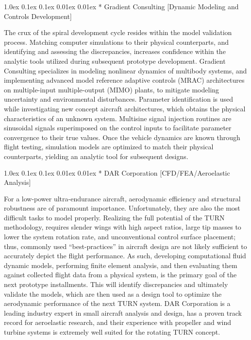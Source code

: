 \documentclass[11pt]{article}
\makeatletter
\renewcommand\subsection{
\@startsection{subsection}{2}{\z@}%
{1.0ex \@plus 0.1ex \@minus 0.1ex}%
{0.01ex \@plus 0.01ex}%
{\normalfont\Large\bfseries}}
\makeatother
\begin{document}
\subsection*{\color{green} Gradient Consulting [Dynamic Modeling and Controls Development]}

The crux of the spiral development cycle resides within the model validation process.  Matching computer simulations to their physical counterparts, and identifying and assessing the discrepancies, increases confidence within the analytic tools utilized during subsequent prototype development.  Gradient Consulting specializes in modeling nonlinear dynamics of multibody systems, and implementing advanced model reference adaptive controls (MRAC) architectures on multiple-input multiple-output (MIMO) plants, to mitigate modeling uncertainty and environmental disturbances.  Parameter identification is used while investigating new concept aircraft architectures, which obtains the physical characteristics of an unknown system.  Multisine signal injection routines are sinusoidal signals superimposed on the control inputs to facilitate parameter convergence to their true values.  Once the vehicle dynamics are known through flight testing, simulation models are optimized to match their physical counterparts, yielding an analytic tool for subsequent designs.




\subsection*{\color{green} DAR Corporation [CFD/FEA/Aeroelastic Analysis]}

For a low-power ultra-endurance aircraft, aerodynamic efficiency and structural robustness are of paramount importance.  Unfortunately, they are also the most difficult tasks to model properly.  Realizing the full potential of the TURN methodology, requires slender wings with high aspect ratios, large tip masses to lower the system rotation rate, and unconventional control surface placement; thus, commonly used ``best-practices'' in aircraft design are not likely sufficient to accurately depict the flight performance.  As such, developing computational fluid dynamic models, performing finite element analysis, and then evaluating them against collected flight data from a physical system, is the primary goal of the next prototype installments.  This will identify discrepancies and ultimately validate the models, which are then used as a design tool to optimize the aerodynamic performance of the next TURN system.  DAR Corporation is a leading industry expert in small aircraft analysis and design, has a proven track record for aeroelastic research, and their experience with propeller and wind turbine systems is extremely well suited for the rotating TURN concept.
\end{document}
